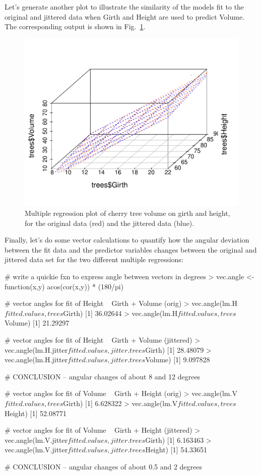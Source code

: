 Let's generate another plot to illustrate the similarity of the models fit to the original and jittered data when Girth and Height are used to predict Volume. The corresponding output is shown in Fig.~\ref{fig:jittervolume}.
%
%
\begin{figure}[htbp]
\centering
\includegraphics[width=0.5\columnwidth]{./figures/hands-on4/trees-jitterfit-volume.pdf}
\caption{Multiple regression plot of cherry tree volume on girth and height, for the original data (red) and the jittered data (blue).\label{fig:jittervolume}}
\end{figure}

Finally, let's do some vector calculations to quantify how the angular deviation between the fit data and the predictor variables changes between the original and jittered data set for the two different multiple regressions:
%
\begin{R}

# write a quickie fxn to express angle between vectors in degrees
> vec.angle <- function(x,y) { acos(cor(x,y)) * (180/pi)}

# vector angles for fit of Height ~ Girth + Volume (orig)
> vec.angle(lm.H$fitted.values, trees$Girth)
[1] 36.02644
> vec.angle(lm.H$fitted.values, trees$Volume)
[1] 21.29297

# vector angles for fit of Height ~ Girth + Volume (jittered)
> vec.angle(lm.H.jitter$fitted.values, jitter.trees$Girth)
[1] 28.48079
> vec.angle(lm.H.jitter$fitted.values, jitter.trees$Volume)
[1] 9.097828

# CONCLUSION -- angular changes of about 8 and 12 degrees 


# vector angles for fit of Volume ~ Girth + Height (orig)
> vec.angle(lm.V$fitted.values, trees$Girth)
[1] 6.628322
> vec.angle(lm.V$fitted.values, trees$Height)
[1] 52.08771

# vector angles for fit of Volume ~ Girth + Height (jittered)
> vec.angle(lm.V.jitter$fitted.values, jitter.trees$Girth)
[1] 6.163463
> vec.angle(lm.V.jitter$fitted.values, jitter.trees$Height)
[1] 54.33651

# CONCLUSION -- angular changes of about 0.5 and 2 degrees
\end{R}


